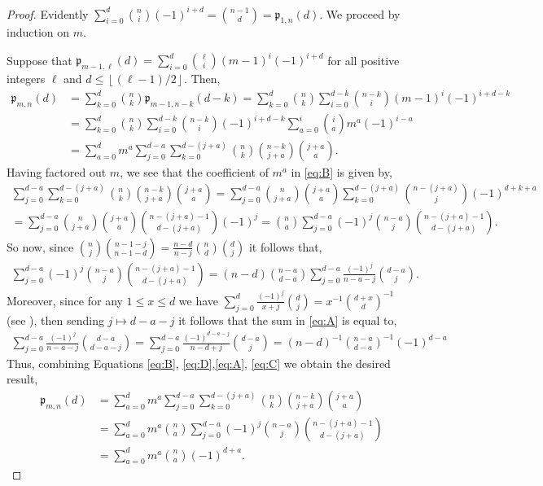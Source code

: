 \documentclass[12pt,reqno]{amsart}
\numberwithin{equation}{section}
\theoremstyle{plain}
\theoremstyle{definition}
\theoremstyle{remark}
\newcommand{\p}{\mathfrak{p}}
\newcommand{\floor}[1]{\left\lfloor#1\right\rfloor}
\begin{document}
\begin{proof}
    Evidently $ \sum_{i=0}^{d} \binom{n}{i}(-1)^{i+d} = \binom{n-1}{d}=\p_{1,n}(d)$. We proceed by induction on $m$. 

    Suppose that $\p_{m-1,\ell}(d)= \sum_{i=0}^{d} \binom{\ell}{i}(m-1)^i(-1)^{i+d}$ for all positive integers $\ell$ and $d\leq \floor{(\ell-1)/2}$. Then, 
\begin{align}
    \p_{m, n}(d) &=\sum_{k=0}^d\binom{n}{k}\p_{m-1, n-k}(d-k) = \sum_{k=0}^d\binom{n}{k}\sum_{i=0}^{d-k} \binom{n-k}{i}(m-1)^i(-1)^{i+d-k} \nonumber \\
    &=  \sum_{k=0}^d\binom{n}{k}\sum_{i=0}^{d-k} \binom{n-k}{i}(-1)^{i+d-k} \sum_{a =0}^i \binom{i}{a}m^{a}(-1)^{i-a} \nonumber \\
    &= \sum_{a=0}^d m^a \sum_{j=0}^{d-a}\sum_{k=0}^{d-(j+a)} \binom{n}{k}\binom{n-k}{j+a}\binom{j+a}{a}. \label{eq:B}
    \end{align}
    Having factored out $m$, we see that the coefficient of $m^a$ in \eqref{eq:B} is given by,
\begin{align}
    \sum_{j=0}^{d-a}\sum_{k=0}^{d-(j+a)} \binom{n}{k}\binom{n-k}{j+a}\binom{j+a}{a} = \sum_{j=0}^{d-a} \binom{n}{j+a}\binom{j+a}{a} \sum_{k=0}^{d-(j+a)} \binom{n-(j+a)}{j}(-1)^{d+k+a}\nonumber\\
    = \sum_{j=0}^{d-a} \binom{n}{j+a}\binom{j+a}{a}\binom{n-(j+a)-1}{d-(j+a)}(-1)^j = \binom{n}{a} \sum_{j=0}^{d-a} (-1)^j \binom{n-a}{j}\binom{n-(j+a)-1}{d-(j+a)}.\label{eq:D}
\end{align}
So now, since $\binom{n}{j}\binom{n-1-j}{n-1-d}=\frac{n-d}{n-j} \binom{n}{d}\binom{d}{j}$ it follows that, 
\begin{align}\label{eq:A}
    \sum_{j=0}^{d-a} (-1)^j \binom{n-a}{j}\binom{n-(j+a)-1}{d-(j+a)} =(n-d) \binom{n-a}{d-a} \sum_{j=0}^{d-a} \frac{(-1)^j }{n-a-j}\binom{d-a}{j}.
\end{align}
Moreover, since for any $1\leq x \leq d$ we have $\sum_{j=0}^d \frac{(-1)^j}{x+j}\binom{d}{j} = x^{-1}\binom{d+x}{d}^{-1}$ (see \cite[Eq. (5.41)]{ConcreteMathematics}), then sending $j\mapsto d-a-j$ it follows that the sum in \eqref{eq:A} is equal to,
\begin{align}
\sum_{j=0}^{d-a} \frac{(-1)^j }{n-a-j}\binom{d-a}{d-a-j} = 
\sum_{j=0}^{d-a} 
\frac{(-1)^{d-a-j}}{n-d+j}\binom{d-a}{j}
= 
(n-d)^{-1}\binom{n-a}{d-a}^{-1}(-1)^{d-a}\label{eq:C}
\end{align}
Thus, combining Equations \eqref{eq:B}, \eqref{eq:D},\eqref{eq:A}, \eqref{eq:C} we obtain the desired result, 
\begin{align*}
    \p_{m,n}(d)&=\sum_{a=0}^d m^a \sum_{j=0}^{d-a}\sum_{k=0}^{d-(j+a)} \binom{n}{k}\binom{n-k}{j+a}\binom{j+a}{a}\\
    &=\sum_{a=0}^d m^a \binom{n}{a} \sum_{j=0}^{d-a} (-1)^j \binom{n-a}{j}\binom{n-(j+a)-1}{d-(j+a)}\\
    &=\sum_{a=0}^d m^a \binom{n}{a} (-1)^{d+a}.
\end{align*}
\end{proof}
\end{document}
